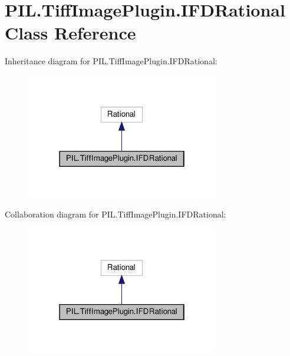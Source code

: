 \hypertarget{classPIL_1_1TiffImagePlugin_1_1IFDRational}{}\section{P\+I\+L.\+Tiff\+Image\+Plugin.\+I\+F\+D\+Rational Class Reference}
\label{classPIL_1_1TiffImagePlugin_1_1IFDRational}


Inheritance diagram for P\+I\+L.\+Tiff\+Image\+Plugin.\+I\+F\+D\+Rational\+:
\nopagebreak
\begin{figure}[H]
\begin{center}
\leavevmode
\includegraphics[width=238pt]{classPIL_1_1TiffImagePlugin_1_1IFDRational__inherit__graph}
\end{center}
\end{figure}


Collaboration diagram for P\+I\+L.\+Tiff\+Image\+Plugin.\+I\+F\+D\+Rational\+:
\nopagebreak
\begin{figure}[H]
\begin{center}
\leavevmode
\includegraphics[width=238pt]{classPIL_1_1TiffImagePlugin_1_1IFDRational__coll__graph}
\end{center}
\end{figure}
